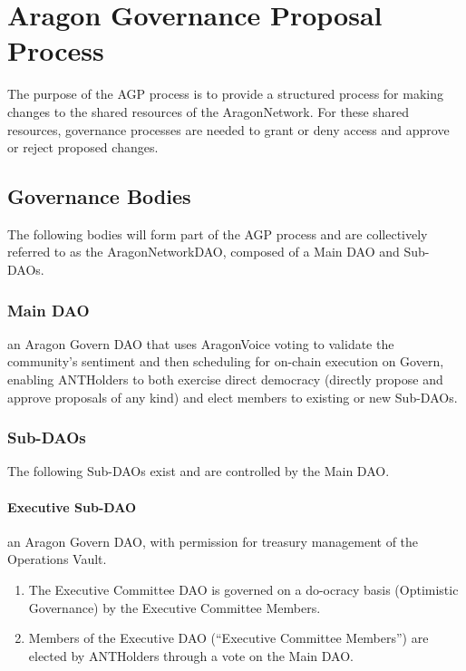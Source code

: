 
\chapter{Aragon Governance Proposal Process}
\label{chap:AGPProcess}
\restartnumbering

The purpose of the \acf{AGP} process is to provide a structured process for making changes to the shared resources of the \gls{AragonNetwork}.
For these shared resources, governance processes are needed to grant or deny access and approve or reject proposed changes.

\section{Governance Bodies}

The following bodies will form part of the \ac{AGP} process and are collectively referred to as the \gls{AragonNetworkDAO}, composed of a Main \ac{DAO} and Sub-\acp{DAO}. 


\subsection{Main \ac{DAO}}

an Aragon Govern \ac{DAO} that uses \gls{AragonVoice} voting to validate the community’s sentiment and then scheduling for on-chain execution on Govern, enabling \glspl{ANTHolder} to both exercise direct democracy (directly propose and approve proposals of any kind) and elect members to existing or new Sub-\acp{DAO}.


\subsection{Sub-\acp{DAO}} 

The following Sub-\acp{DAO} exist and are controlled by the Main \ac{DAO}.


\subsubsection*{Executive Sub-\ac{DAO}}

an Aragon Govern \ac{DAO}, with permission for treasury management of the Operations Vault.
\begin{enumerate}
	\item The Executive Committee \ac{DAO} is governed on a do-ocracy basis (Optimistic Governance) by the Executive Committee Members.
	\item Members of the Executive \ac{DAO} (``Executive Committee Members'') are elected by \glspl{ANTHolder} through a vote on the Main \ac{DAO}.
\end{enumerate}


